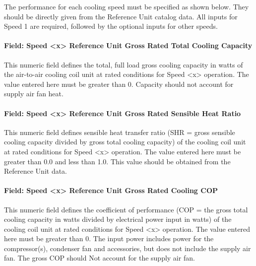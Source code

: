 The performance for each cooling speed must be specified as shown below. They should be directly given from the Reference Unit catalog data. All inputs for Speed 1 are required, followed by the optional inputs for other speeds.

\paragraph{Field: Speed \textless{}x\textgreater{} Reference Unit Gross Rated Total Cooling Capacity}\label{field-speed-x-reference-unit-gross-rated-total-cooling-capacity}

This numeric field defines the total, full load gross cooling capacity in watts of the air-to-air cooling coil unit at rated conditions for Speed \textless{}x\textgreater{} operation. The value entered here must be greater than 0. Capacity should not account for supply air fan heat.

\paragraph{Field: Speed \textless{}x\textgreater{} Reference Unit Gross Rated Sensible Heat Ratio}\label{field-speed-x-reference-unit-gross-rated-sensible-heat-ratio}

This numeric field defines sensible heat transfer ratio (SHR = gross sensible cooling capacity divided by gross total cooling capacity) of the cooling coil unit at rated conditions for Speed \textless{}x\textgreater{} operation. The value entered here must be greater than 0.0 and less than 1.0. This value should be obtained from the Reference Unit data.

\paragraph{Field: Speed \textless{}x\textgreater{} Reference Unit Gross Rated Cooling COP}\label{field-speed-x-reference-unit-gross-rated-cooling-cop}

This numeric field defines the coefficient of performance (COP = the gross total cooling capacity in watts divided by electrical power input in watts) of the cooling coil unit at rated conditions for Speed \textless{}x\textgreater{} operation. The value entered here must be greater than 0. The input power includes power for the compressor(s), condenser fan and accessories, but does not include the supply air fan. The gross COP should Not account for the supply air fan.

